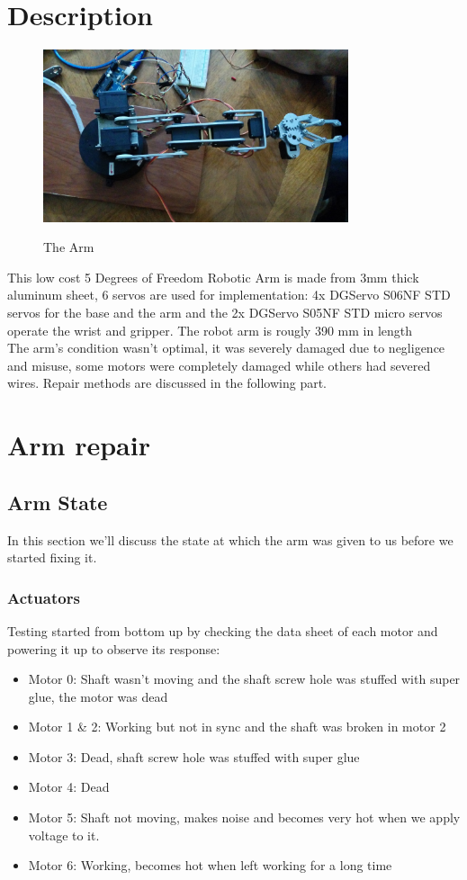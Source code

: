 \documentclass[11pt,a4paper]{report}
\begin{document}
\section{Description}
\begin{figure}[h]
\centering
{\includegraphics[width=0.8\textwidth]{Figures/Arm.jpg}}
\caption{The Arm}
\label{fig:arm}
\end{figure}
This low cost 5 Degrees of Freedom Robotic Arm is made from 3mm thick aluminum sheet, 6 servos are used for implementation: 4x DGServo S06NF STD servos for the base and the arm and the 2x DGServo S05NF STD micro servos operate the wrist and gripper. The robot arm is rougly 390 mm in length \cite{datasheet}\\
The arm's condition wasn't optimal, it was severely damaged due to negligence and misuse, some motors were completely damaged while others had severed wires. Repair methods are discussed in the following part.
\section{Arm repair}
\subsection{Arm State}
In this section we'll discuss the state at which the arm was given to us before we started fixing it.
\subsubsection{Actuators}
Testing started from bottom up by checking the data sheet of each motor and powering it up to observe its response:
\begin{itemize}
\item Motor 0: Shaft wasn't moving and the shaft screw hole was stuffed with super glue, the motor was dead
\item Motor 1 \& 2: Working but not in sync and the shaft was broken in motor 2
\item Motor 3: Dead, shaft screw hole was stuffed with super glue
\item Motor 4: Dead
\item Motor 5: Shaft not moving, makes noise and becomes very hot when we apply voltage to it.
\item Motor 6: Working, becomes hot when left working for a long time  
\end{itemize}
\end{document}
